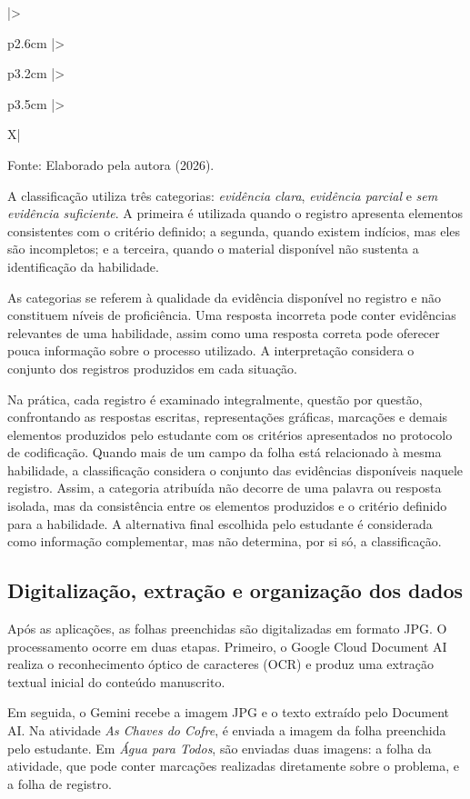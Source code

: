 {\begin{xltabular}{\textwidth}{
    |>{\raggedright\arraybackslash}p{2.6cm}
    |>{\raggedright\arraybackslash}p{3.2cm}
    |>{\raggedright\arraybackslash}p{3.5cm}
    |>{\raggedright\arraybackslash}X|}
\end{xltabular}

\vspace{1mm}

\begin{flushleft}
    \footnotesize
    Fonte: Elaborado pela autora (2026).
\end{flushleft}

}

A classificação utiliza três categorias: \textit{evidência clara},
\textit{evidência parcial} e \textit{sem evidência suficiente}.
A primeira é utilizada quando o registro apresenta elementos
consistentes com o critério definido; a segunda, quando existem
indícios, mas eles são incompletos; e a terceira, quando o material
disponível não sustenta a identificação da habilidade.

As categorias se referem à qualidade da evidência disponível no registro e não constituem níveis de proficiência. Uma resposta
incorreta pode conter evidências relevantes de uma habilidade, assim
como uma resposta correta pode oferecer pouca informação sobre o
processo utilizado. A interpretação considera o conjunto dos registros produzidos em cada situação.

Na prática, cada registro é examinado integralmente, questão por questão, confrontando as respostas escritas, representações gráficas, marcações e demais elementos produzidos pelo estudante com os critérios apresentados no protocolo de codificação. Quando mais de um campo da folha está relacionado à mesma habilidade, a classificação considera o conjunto das evidências disponíveis naquele registro. Assim, a categoria atribuída não decorre de uma palavra ou resposta isolada, mas da consistência entre os elementos produzidos e o critério definido para a habilidade. A alternativa final escolhida pelo estudante é considerada como informação complementar, mas não determina, por si só, a classificação.

\subsection{Digitalização, extração e organização dos dados}

Após as aplicações, as folhas preenchidas são digitalizadas em formato JPG. O processamento ocorre em duas etapas. Primeiro, o Google Cloud Document AI realiza o reconhecimento óptico de caracteres (OCR) e produz uma extração textual inicial do conteúdo manuscrito.

Em seguida, o Gemini recebe a imagem JPG e o texto extraído pelo Document AI. Na atividade \textit{As Chaves do Cofre}, é enviada a imagem da folha preenchida pelo estudante. Em \textit{Água para Todos}, são enviadas duas imagens: a folha da atividade, que pode conter marcações realizadas diretamente sobre o problema, e a folha de registro.

